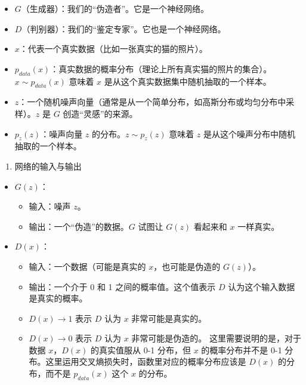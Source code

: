 \begin{itemize}
\tightlist
\item
  \(G\)（生成器）：我们的``伪造者''。它是一个神经网络。
\item
  \(D\)（判别器）：我们的``鉴定专家''。它也是一个神经网络。
\item
  \(x\)：代表一个真实数据（比如一张真实的猫的照片）。
\item
  \(p_{data}(x)\)：真实数据的概率分布（理论上所有真实猫的照片的集合）。\(x \sim p_{data}(x)\) 意味着 \(x\) 是从这个真实数据集中随机抽取的一个样本。
\item
  \(z\)：一个随机噪声向量（通常是从一个简单分布，如高斯分布或均匀分布中采样）。\(z\) 是 \(G\) 创造``灵感''的来源。
\item
  \(p_z(z)\)：噪声向量 \(z\) 的分布。\(z \sim p_z(z)\) 意味着 \(z\) 是从这个噪声分布中随机抽取的一个样本。
\end{itemize}

\begin{enumerate}
\def\labelenumi{\arabic{enumi}.}
\setcounter{enumi}{1}
\tightlist
\item
  网络的输入与输出
\end{enumerate}

\begin{itemize}
\tightlist
\item
{}
  \(G(z)\)：

  \begin{itemize}
  \tightlist
  \item
    输入：噪声 \(z\)。
  \item
    输出：一个``伪造''的数据。\(G\) 试图让 \(G(z)\) 看起来和 \(x\) 一样真实。
  \end{itemize}
\item
{}
  \(D(x)\)：

  \begin{itemize}
  \tightlist
  \item
    输入：一个数据（可能是真实的 \(x\)，也可能是伪造的 \(G(z)\)）。
  \item
    输出：一个介于 0 和 1 之间的概率值。这个值表示 \(D\) 认为这个输入数据是真实的概率。
  \item
    \(D(x)\to 1\) 表示 \(D\) 认为 \(x\) 非常可能是真实的。
  \item
    \(D(x)\to 0\) 表示 \(D\) 认为 \(x\) 非常可能是伪造的。
    这里需要说明的是，对于数据 \(x\)，\(D(x)\) 的真实值服从 0-1 分布，但 \(x\) 的概率分布并不是 0-1 分布。这里运用交叉熵损失时，函数里对应的概率分布应该是 \(D(x)\) 的分布，而不是 \(p_{data}(x)\) 这个 \(x\) 的分布。
  \end{itemize}
\end{itemize}


